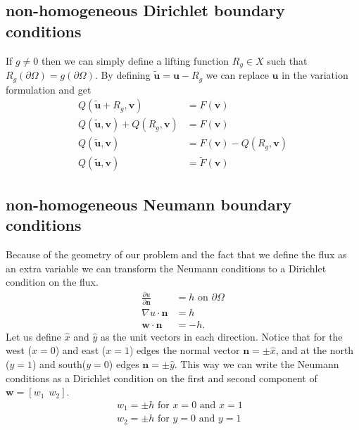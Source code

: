 \subsection{non-homogeneous Dirichlet boundary conditions}
If $g \neq 0$ then we can simply define a lifting function $R_g \in X$ such that $R_g(\partial \Omega) = g(\partial \Omega)$. By defining $\tilde{\mathbf{u}}=\mathbf{u}-R_g$ we can replace $\mathbf{u}$ in the variation formulation and get 
\begin{align}
	Q(\tilde{\mathbf{u}}+R_g,\mathbf{v}) &= F(\mathbf{v}) \\
	Q(\tilde{\mathbf{u}},\mathbf{v})+Q(R_g,\mathbf{v}) &= F(\mathbf{v}) \\
	Q(\tilde{\mathbf{u}},\mathbf{v}) &= F(\mathbf{v}) - Q(R_g,\mathbf{v})\\
	Q(\tilde{\mathbf{u}},\mathbf{v}) &= \tilde{F}(\mathbf{v}) 
	\label{eq:liftingFunc}
\end{align}
%
\subsection{non-homogeneous Neumann boundary conditions}
Because of the geometry of our problem and the fact that we define the flux as an extra variable we can transform the Neumann conditions to a Dirichlet condition on the flux. 
\begin{align}
	\frac{\partial u}{\partial \mathbf{n}} &= h \text{  on   } \partial \Omega \\
	\nabla u \cdot \mathbf{n} &= h \\
	 \mathbf{w} \cdot \mathbf{n} &= -h. 
	\label{eq:neumann}
\end{align}
Let us define $\hat{x}$ and $\hat{y}$ as the unit vectors in each direction. Notice that for the west ($x=0$) and east ($x=1$) edges the normal vector $\mathbf{n}= \pm\hat{x}$, and at the north ($y=1$) and south($y=0$) edges $\mathbf{n}=\pm \hat{y}$. This way we can write the Neumann conditions as a Dirichlet condition on the first and second component of $\mathbf{w}= [ w_1 \:\: w_2]$. 
\begin{align}
	w_1 = \pm h \text{    for $x = 0$ and $x=1$ }\\
	w_2 = \pm h \text{    for $y = 0$ and $y=1$ }
	\label{eq:neumannAsDirichlet}
\end{align}

